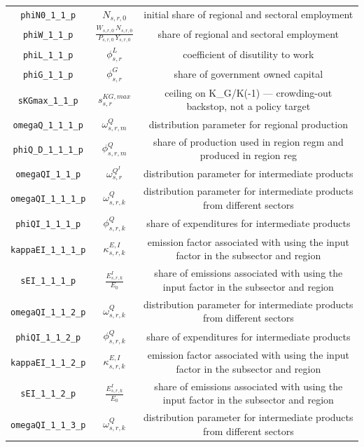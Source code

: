 \begin{center}
\begin{longtable}{ccc}
\texttt{phiN0\_1\_1\_p} & ${N_{s,r,0}}$ & initial share of regional and sectoral employment\\
\texttt{phiW\_1\_1\_p} & $\frac{W_{s,r,0} \, N_{s,r,0}}{P_{s,r,0} \, Y_{s,r,0}}$ & share of regional and sectoral employment\\
\texttt{phiL\_1\_1\_p} & ${\phi^{L}_{s,r}}$ & coefficient of disutility to work\\
\texttt{phiG\_1\_1\_p} & ${\phi^{G}_{s,r}}$ & share of government owned capital\\
\texttt{sKGmax\_1\_1\_p} & ${s^{KG,max}_{s,r}}$ & ceiling on K\_G/K(-1) — crowding-out backstop, not a policy target\\
\texttt{omegaQ\_1\_1\_1\_p} & ${\omega^{Q}_{s,r,m}}$ & distribution parameter for regional production\\
\texttt{phiQ\_D\_1\_1\_1\_p} & ${\phi^{Q}_{s,r,m}}$ & share of production used in region regm and produced in region reg\\
\texttt{omegaQI\_1\_1\_p} & ${\omega^{Q^{I}}_{s,r}}$ & distribution parameter for intermediate products\\
\texttt{omegaQI\_1\_1\_1\_p} & ${\omega^{Q}_{s,r,k}}$ & distribution parameter for intermediate products from different sectors\\
\texttt{phiQI\_1\_1\_1\_p} & ${\phi^{Q}_{s,r,k}}$ & share of expenditures for intermediate products\\
\texttt{kappaEI\_1\_1\_1\_p} & ${\kappa^{E,I}_{s,r,k}}$ & emission factor associated with using the input factor in the subsector and region\\
\texttt{sEI\_1\_1\_1\_p} & ${\frac{E^{I}_{s,r,k}}{E_0}}$ & share of emissions associated with using the input factor in the subsector and region\\
\texttt{omegaQI\_1\_1\_2\_p} & ${\omega^{Q}_{s,r,k}}$ & distribution parameter for intermediate products from different sectors\\
\texttt{phiQI\_1\_1\_2\_p} & ${\phi^{Q}_{s,r,k}}$ & share of expenditures for intermediate products\\
\texttt{kappaEI\_1\_1\_2\_p} & ${\kappa^{E,I}_{s,r,k}}$ & emission factor associated with using the input factor in the subsector and region\\
\texttt{sEI\_1\_1\_2\_p} & ${\frac{E^{I}_{s,r,k}}{E_0}}$ & share of emissions associated with using the input factor in the subsector and region\\
\texttt{omegaQI\_1\_1\_3\_p} & ${\omega^{Q}_{s,r,k}}$ & distribution parameter for intermediate products from different sectors\\

\end{longtable}
\end{center}
